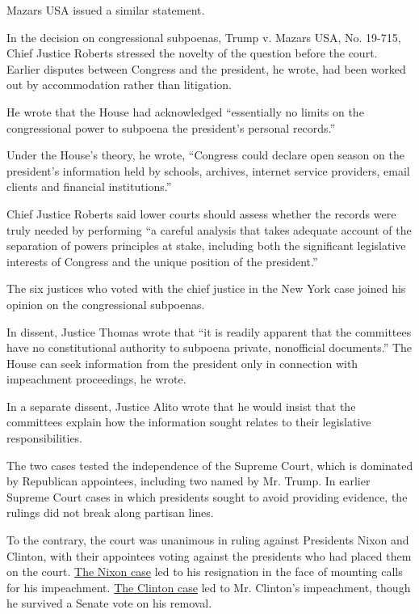 Mazars USA issued a similar statement.

In the decision on congressional subpoenas, Trump v. Mazars USA, No.
19-715, Chief Justice Roberts stressed the novelty of the question
before the court. Earlier disputes between Congress and the president,
he wrote, had been worked out by accommodation rather than litigation.

He wrote that the House had acknowledged ``essentially no limits on the
congressional power to subpoena the president's personal records.''

Under the House's theory, he wrote, ``Congress could declare open season
on the president's information held by schools, archives, internet
service providers, email clients and financial institutions.''

Chief Justice Roberts said lower courts should assess whether the
records were truly needed by performing ``a careful analysis that takes
adequate account of the separation of powers principles at stake,
including both the significant legislative interests of Congress and the
unique position of the president.''

The six justices who voted with the chief justice in the New York case
joined his opinion on the congressional subpoenas.

In dissent, Justice Thomas wrote that ``it is readily apparent that the
committees have no constitutional authority to subpoena private,
nonofficial documents.'' The House can seek information from the
president only in connection with impeachment proceedings, he wrote.

In a separate dissent, Justice Alito wrote that he would insist that the
committees explain how the information sought relates to their
legislative responsibilities.

The two cases tested the independence of the Supreme Court, which is
dominated by Republican appointees, including two named by Mr. Trump. In
earlier Supreme Court cases in which presidents sought to avoid
providing evidence, the rulings did not break along partisan lines.

To the contrary, the court was unanimous in ruling against Presidents
Nixon and Clinton, with their appointees voting against the presidents
who had placed them on the court.
\href{https://www.law.cornell.edu/supremecourt/text/418/683}{The Nixon
case} led to his resignation in the face of mounting calls for his
impeachment.
\href{https://www.law.cornell.edu/supremecourt/text/520/681}{The Clinton
case} led to Mr. Clinton's impeachment, though he survived a Senate vote
on his removal.


